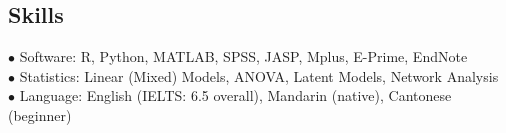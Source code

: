 \documentclass[a4paper, 10pt]{article}
\makeatletter
\newcounter{indexcounter}
\newcommand{\autoindex}[1]{%
    \stepcounter{indexcounter}%
    \noindent\hangindent=2.5em%
    \makebox[2.3em][l]{[\theindexcounter]}%
    \index{#1@[{\theindexcounter}] #1}%
}
\makeatother
\begin{document}
\bigskip







\subsection*{Skills}

$\bullet$\hspace{1.8em} Software: R, Python, MATLAB, SPSS, JASP, Mplus, E-Prime, EndNote \\


$\bullet$\hspace{1.8em} Statistics: Linear (Mixed) Models, ANOVA, Latent Models, Network Analysis \\

$\bullet$\hspace{1.8em} Language: English (IELTS: 6.5 overall), Mandarin (native), Cantonese (beginner) \\

\bigskip

\end{document}

